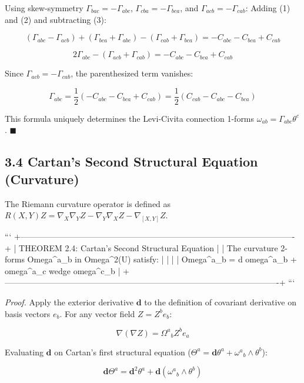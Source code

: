 \documentclass[11pt,twoside,openright]{amsbook}
\begin{document}
{{{{{{Using skew-symmetry $\Gamma_{bac} = -\Gamma_{abc}$, $\Gamma_{cba} = -\Gamma_{bca}$, and $\Gamma_{acb} = -\Gamma_{cab}$:
Adding (1) and (2) and subtracting (3):

$$(\Gamma_{abc} - \Gamma_{acb}) + (\Gamma_{bca} + \Gamma_{abc}) - (\Gamma_{cab} + \Gamma_{bca}) = -C_{abc} - C_{bca} + C_{cab}$$

$$2 \Gamma_{abc} - (\Gamma_{acb} + \Gamma_{cab}) = -C_{abc} - C_{bca} + C_{cab}$$

Since $\Gamma_{acb} = -\Gamma_{cab}$, the parenthesized term vanishes:

$$\Gamma_{abc} = \frac{1}{2} \left( -C_{abc} - C_{bca} + C_{cab} \right) = \frac{1}{2} \left( C_{cab} - C_{abc} - C_{bca} \right)$$

This formula uniquely determines the Levi-Civita connection 1-forms $\omega_{ab} = \Gamma_{abc} \theta^c$. $\blacksquare$

\subsection{3.4 Cartan's Second Structural Equation (Curvature)}

The Riemann curvature operator is defined as $R(X, Y)Z = \nabla_X \nabla_Y Z - \nabla_Y \nabla_X Z - \nabla_{[X,Y]} Z$.

```
+----------------------------------------------------------------------------------------------------+
| THEOREM 2.4: Cartan's Second Structural Equation                                                   |
| The curvature 2-forms Omega^a{}_b in Omega^2(U) satisfy:                                            |
|                                                                                                    |
|   Omega^a{}_b = d omega^a{}_b + omega^a{}_c wedge omega^c{}_b                                      |
+----------------------------------------------------------------------------------------------------+
```

\textit{Proof.} Apply the exterior derivative $\mathbf{d}$ to the definition of covariant derivative on basis vectors $e_b$. For any vector field $Z = Z^b e_b$:

$$\nabla (\nabla Z) = \Omega^a{}_b Z^b e_a$$

Evaluating $\mathbf{d}$ on Cartan's first structural equation ($\Theta^a = \mathbf{d}\theta^a + \omega^a{}_b \wedge \theta^b$):

$$\mathbf{d}\Theta^a = \mathbf{d}^2 \theta^a + \mathbf{d}(\omega^a{}_b \wedge \theta^b)$$

}}}}}}
\end{document}

